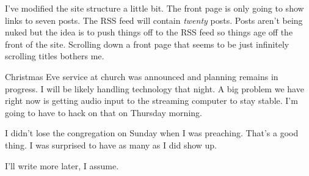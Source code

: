I've modified the site structure a little bit. The front page is only
going to show links to seven posts. The RSS feed will contain
\emph{twenty} posts. Posts aren't being nuked but the idea is to push
things off to the RSS feed so things age off the front of the site.
Scrolling down a front page that seems to be just infinitely scrolling
titles bothers me.

Christmas Eve service at church was announced and planning remains in
progress. I will be likely handling technology that night. A big problem
we have right now is getting audio input to the streaming computer to
stay stable. I'm going to have to hack on that on Thursday morning.

I didn't lose the congregation on Sunday when I was preaching. That's a
good thing. I was surprised to have as many as I did show up.

I'll write more later, I assume.
